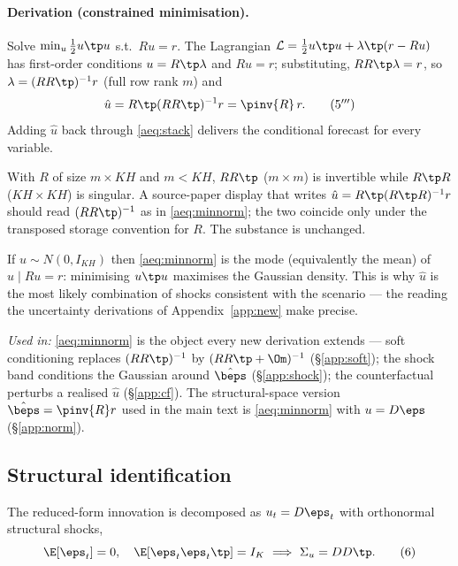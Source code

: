 \paragraph{Derivation (constrained minimisation).} Solve
$\min_u\tfrac12u\tp u$ s.t.\ $Ru=r$. The Lagrangian
$\mathcal L=\tfrac12u\tp u+\lambda\tp(r-Ru)$ has first-order conditions
$u=R\tp\lambda$ and $Ru=r$; substituting, $RR\tp\lambda=r$, so
$\lambda=(RR\tp)^{-1}r$ (full row rank $m$) and
\begin{equation}
\hat u=R\tp(RR\tp)^{-1}r=\pinv{R}\,r.
\tag{5$'''$}\label{aeq:minnorm}
\end{equation}
Adding $\hat u$ back through \eqref{aeq:stack} delivers the conditional forecast
for every variable.

\begin{remark}
With $R$ of size $m\times KH$ and $m<KH$, $RR\tp$ ($m\times m$) is invertible
while $R\tp R$ ($KH\times KH$) is singular. A source-paper display that writes
$\hat u=R\tp(R\tp R)^{-1}r$ should read $(RR\tp)^{-1}$ as in \eqref{aeq:minnorm};
the two coincide only under the transposed storage convention for $R$. The
substance is unchanged.
\end{remark}

\begin{remark}
If $u\sim N(0,I_{KH})$ then \eqref{aeq:minnorm} is the mode (equivalently the mean)
of $u\mid Ru=r$: minimising $u\tp u$ maximises the Gaussian density. This is why
$\hat u$ is the most likely combination of shocks consistent with the scenario ---
the reading the uncertainty derivations of Appendix~\ref{app:new} make precise.
\end{remark}

\medskip
\noindent\textit{Used in:} \eqref{aeq:minnorm} is the object every new derivation
extends --- soft conditioning replaces $(RR\tp)^{-1}$ by $(RR\tp+\Om)^{-1}$
(\S\ref{app:soft}); the shock band conditions the Gaussian around $\hat\beps$
(\S\ref{app:shock}); the counterfactual perturbs a realised $\hat u$
(\S\ref{app:cf}). The structural-space version $\hat\beps=\pinv{R}r$ used in the
main text is \eqref{aeq:minnorm} with $u=D\eps$ (\S\ref{app:norm}).

\subsection{Structural identification}\label{app:ident2}
The reduced-form innovation is decomposed as $u_t=D\eps_t$ with orthonormal
structural shocks,
\begin{equation}
\E[\eps_t]=0,\quad \E[\eps_t\eps_t\tp]=I_K
\ \Longrightarrow\ \Sigma_u=DD\tp.
\tag{6}\label{aeq:struct}
\end{equation}

